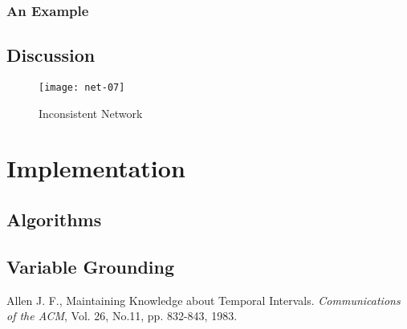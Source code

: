 \documentclass[11pt]{report}
\begin{document}
      \subsection{An Example}    

    \section{Discussion}

      \begin{figure}[[tbhp]
        \begin{center}
          \texttt{[image: net-07]}
          \caption{Inconsistent Network}
          \label{fig-net-ex-07}
        \end{center}
      \end{figure}

  \chapter{Implementation}

    \section{Algorithms}

    \section{Variable Grounding}

  \begin{thebibliography}{00}
      Allen J. F.,
      Maintaining Knowledge about Temporal Intervals.
      {\em Communications of the ACM},
      Vol. 26, No.11, pp. 832-843,
      1983.
  \end{thebibliography}
\end{document}
